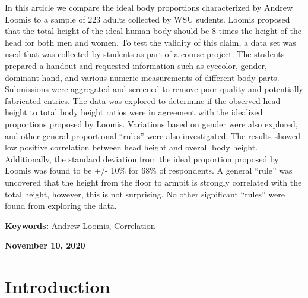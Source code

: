 \documentclass[]{article}
\renewenvironment{abstract}
 {{%
    \setlength{\leftmargin}{0mm}
    \setlength{\rightmargin}{\leftmargin}%
  }%
  \relax}
 {\endlist}
\begin{document}
\begin{abstract}

    \hbox{\vrule height .2pt width 39.14pc}

    \vskip 8.5pt %

\noindent In this article we compare the ideal body proportions
characterized by Andrew Loomis \citep{Loomis:1943} to a sample of 223
adults collected by WSU sudents. Loomis proposed that the total height
of the ideal human body should be 8 times the height of the head for
both men and women. To test the validity of this claim, a data set was
used that was collected by students as part of a course project. The
students prepared a handout and requested information such as eyecolor,
gender, dominant hand, and various numeric measurements of different
body parts. Submissions were aggregated and screened to remove poor
quality and potentially fabricated entries. The data was explored to
determine if the observed head height to total body height ratios were
in agreement with the idealized proportions proposed by Loomis.
Variations based on gender were also explored, and other general
proportional ``rules'' were also investigated. The results showed low
positive correlation between head height and overall body height.
Additionally, the standard deviation from the ideal proportion proposed
by Loomis was found to be +/- 10\% for 68\% of respondents. A general
``rule'' was uncovered that the height from the floor to armpit is
strongly correlated with the total height, however, this is not
surprising. No other significant ``rules'' were found from exploring the
data.


\vskip 8.5pt \noindent \textbf{\underline{Keywords}:} Andrew Loomis,
Correlation \par

    




    
    \hbox{\vrule height .2pt width 39.14pc}
    \vskip 5pt 
    \hfill \textbf{\textcolor{WSU.gray}{ November 10, 2020 } }
    \vskip 5pt 
    
\end{abstract}


\vskip -8.5pt




\noindent  

\section{Introduction}
\label{sec:intro}
\end{document}
